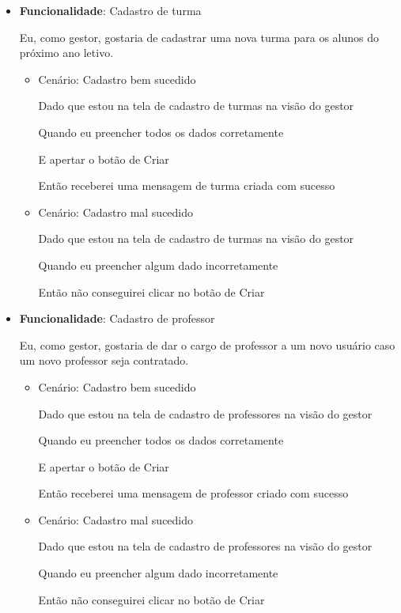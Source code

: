 \documentclass[
    12pt,               %
    openright,          %
    oneside,
    a4paper,            %
    english,            %
    brazil              %
    ]{ifsp-spo-inf-ctds} %
\begin{document}
\begin{itemize}
\item\textbf{Funcionalidade}: Cadastro de turma
    
    Eu, como gestor, gostaria de cadastrar uma nova turma para os alunos do próximo ano letivo.
    \begin{itemize}
        \item Cenário: Cadastro bem sucedido  
        \par Dado que estou na tela de cadastro de turmas na visão do gestor
        \par Quando eu preencher todos os dados corretamente
        \par E apertar o botão de Criar
        \par Então receberei uma mensagem de turma criada com sucesso
    \end{itemize}   
    \begin{itemize}
        \item Cenário: Cadastro mal sucedido  
        \par Dado que estou na tela de cadastro de turmas na visão do gestor
        \par Quando eu preencher algum dado incorretamente
        \par Então não conseguirei clicar no botão de Criar
    \end{itemize}   

\item\textbf{Funcionalidade}: Cadastro de professor
    
    Eu, como gestor, gostaria de dar o cargo de professor a um novo usuário caso um novo professor seja contratado.
    \begin{itemize}
        \item Cenário: Cadastro bem sucedido  
        \par Dado que estou na tela de cadastro de professores na visão do gestor
        \par Quando eu preencher todos os dados corretamente
        \par E apertar o botão de Criar
        \par Então receberei uma mensagem de professor criado com sucesso
    \end{itemize}   
    \begin{itemize}
        \item Cenário: Cadastro mal sucedido  
        \par Dado que estou na tela de cadastro de professores na visão do gestor
        \par Quando eu preencher algum dado incorretamente
        \par Então não conseguirei clicar no botão de Criar
    \end{itemize}   


\end{itemize}
\end{document}
